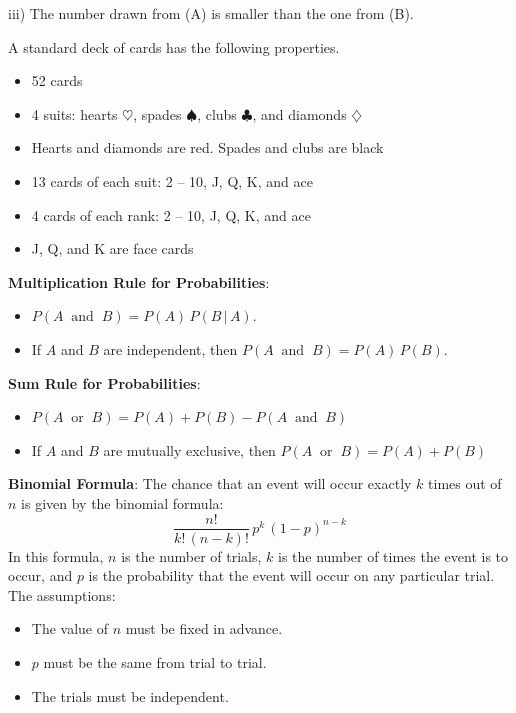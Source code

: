 \documentclass[10pt]{article}
\begin{document}
\hspace{20pt} iii) The number drawn from (A) is smaller than the one from (B).
\vspace{1in}

\vfill
\eject

 A standard deck of cards has the following properties.
\begin{itemize}
\item 52 cards
\item 4 suits:  hearts $\heartsuit$, spades $\spadesuit$, clubs $\clubsuit$,
  and diamonds $\diamondsuit$
\item Hearts and diamonds are red.  Spades and clubs are black
\item 13 cards of each suit:  2 -- 10, J, Q, K, and ace
\item 4 cards of each rank:  2 -- 10, J, Q, K, and ace
\item J, Q, and K are face cards
\end{itemize}

\textbf{Multiplication Rule for Probabilities}:  
\begin{itemize}
\item $P(A\;\;\mbox{and}\;\;B)=P(A)\,P(B\,\vert\,A)$.
\item If $A$ and $B$ are independent, then $P(A\;\;\mbox{and}\;\;B)=P(A)\,P(B)$.
\end{itemize}
\textbf{Sum Rule for Probabilities}:
\begin{itemize}
\item $P(A\;\;\mbox{or}\;\;B)=P(A)+P(B) - P(A\;\;\mbox{and}\;\;B)$
\item If $A$ and $B$ are mutually exclusive, then $P(A\;\;\mbox{or}\;\;B)=P(A)+P(B)$
\end{itemize}  
\bigskip


\textbf{Binomial Formula}:
The chance that an event will occur exactly $k$ times out of $n$ is given by 
the binomial formula:
\[\frac{n!}{k!\,(n-k)!}\,p^k\,(1-p)^{n-k}\]
In this formula, $n$ is the number of trials, $k$ is the number of times
the event is to occur, and $p$ is the probability that the event will occur
on any particular trial.    The assumptions:
\begin{itemize}
\item The value of $n$ must be fixed in advance.
\item $p$ must be the same from trial to trial.
\item The trials must be independent.
\end{itemize}
\end{document}
